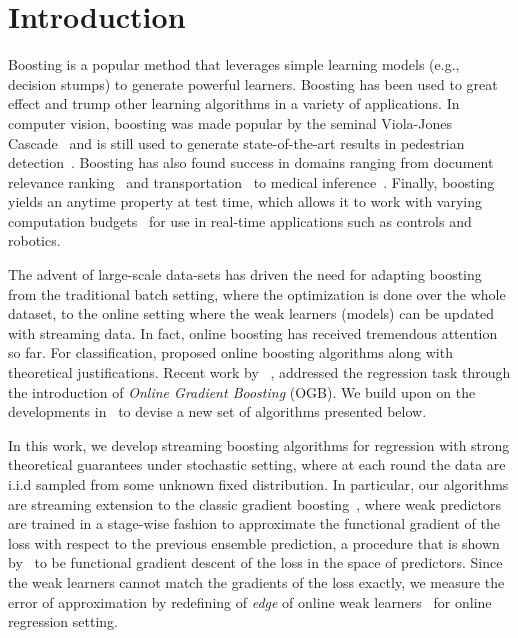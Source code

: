 \section{Introduction}
\label{sec:sgb_introduction}
Boosting \citep{freund1995desicion} is a popular method that leverages simple learning models (e.g., decision stumps) to generate powerful learners. Boosting has been used to great effect and trump other learning algorithms in a variety of applications. In computer vision, boosting was made popular by the seminal Viola-Jones Cascade~\citep{viola2001rapid} and is still used to generate state-of-the-art results in pedestrian detection~\citep{nam2014local,yang2015convolutional,zhu2016}. Boosting has also found success in domains ranging from document relevance ranking~\citep{yahoo} and transportation~\citep{zhang2015gradient} to medical inference~\citep{atkinson2012assessing}. Finally, boosting yields an anytime property at test time, which allows it to work with varying computation budgets~\citep{grubb2012speedboost} for use in real-time applications such as controls and robotics.

The advent of large-scale data-sets has driven the need for adapting boosting from the traditional batch setting, where the optimization is done over the whole dataset, to the online setting where the weak learners (models) can be updated with streaming data. 
In fact, online boosting has received tremendous attention so far. For classification, \citep{lu:2012,Oza01onlinebagging,beygelzimer2015optimal} proposed online boosting algorithms along with theoretical justifications. Recent work by ~\cite{beygelzimer2015online}, addressed the regression task through the introduction of \emph{Online Gradient Boosting} (OGB). 
We build upon on the developments in~\citep{beygelzimer2015online} to devise a new set of algorithms presented below. 

In this work, we develop streaming boosting algorithms for regression with strong theoretical guarantees under stochastic setting, where at each round the data are i.i.d sampled from some unknown fixed distribution. 
In particular, our algorithms are streaming extension to the classic gradient boosting~\citep{friedman2001greedy}, where weak predictors are trained in a stage-wise fashion to approximate the functional gradient of the loss with respect to the previous ensemble prediction, a procedure that is shown by~\cite{Mason00boostingalgorithms} to be functional gradient descent of the loss in the space of predictors. Since the weak learners cannot match the gradients of the loss exactly, we measure the error of approximation by redefining of \emph{edge} of online weak learners~\citep{beygelzimer2015optimal} for online regression setting. 


